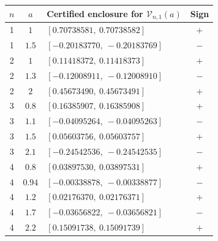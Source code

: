 \begin{center}
\begin{tabular}{cclc}
\toprule
$n$ & $a$ & Certified enclosure for $\mathcal V_{n,1}(a)$ & Sign\\
\midrule
1 & $1$ & $[0.70738581,\ 0.70738582]$ & $+$\\
1 & $1.5$ & $[-0.20183770,\ -0.20183769]$ & $-$\\
2 & $1$ & $[0.11418372,\ 0.11418373]$ & $+$\\
2 & $1.3$ & $[-0.12008911,\ -0.12008910]$ & $-$\\
2 & $2$ & $[0.45673490,\ 0.45673491]$ & $+$\\
3 & $0.8$ & $[0.16385907,\ 0.16385908]$ & $+$\\
3 & $1.1$ & $[-0.04095264,\ -0.04095263]$ & $-$\\
3 & $1.5$ & $[0.05603756,\ 0.05603757]$ & $+$\\
3 & $2.1$ & $[-0.24542536,\ -0.24542535]$ & $-$\\
4 & $0.8$ & $[0.03897530,\ 0.03897531]$ & $+$\\
4 & $0.94$ & $[-0.00338878,\ -0.00338877]$ & $-$\\
4 & $1.2$ & $[0.02176370,\ 0.02176371]$ & $+$\\
4 & $1.7$ & $[-0.03656822,\ -0.03656821]$ & $-$\\
4 & $2.2$ & $[0.15091738,\ 0.15091739]$ & $+$\\
\bottomrule
\end{tabular}
\end{center}
